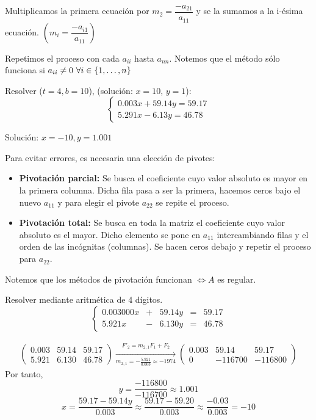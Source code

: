 Multiplicamos la primera ecuación por $m_2=\dfrac{-a_{21}}{a_{11}}$ y se la sumamos a la i-ésima ecuación. $\left(m_i = \dfrac{-a_{i1}}{a_{11}}\right)$

\smallskip
Repetimos el proceso con cada $a_{ii}$ hasta $a_{nn}$.
Notemos que el método sólo funciona si $a_{ii}\neq 0 \ \forall i \in \{1, \ldots, n\}$

\begin{ejercicio*}
    Resolver ($t=4, b=10$), (solución: $x=10$, $y=1$):
    $$
        \left\{
        \begin{array}{c}
            0.003x+59.14y=59.17 \\
            5.291x-6.13y=46.78
        \end{array}\right.
    $$

    Solución: $x=-10, y=1.001$
\end{ejercicio*}

\bigskip
\noindent
Para evitar errores, es necesaria una elección de pivotes:
\begin{itemize}
    \item \textbf{Pivotación parcial:} Se busca el coeficiente cuyo valor absoluto es mayor en la primera columna.
          Dicha fila pasa a ser la primera, hacemos ceros bajo el nuevo $a_{11}$ y para elegir el pivote $a_{22}$
          se repite el proceso.
    \item \textbf{Pivotación total:} Se busca en toda la matriz el coeficiente cuyo valor absoluto es el mayor.
          Dicho elemento se pone en $a_{11}$ intercambiando filas y el orden de las incógnitas (columnas).
          Se hacen ceros debajo y repetir el proceso para $a_{22}$.
\end{itemize}

Notemos que los métodos de pivotación funcionan $\Leftrightarrow A$ es regular.

\begin{ejercicio*} Resolver mediante aritmética de 4 dígitos.
\begin{equation*}
    \left\{\begin{array}{rcrcr}
        0.003000x & + & 59.14y & = & 59.17  \\
        5.921x & - &6.130y & = & 46.78
    \end{array}
    \right.
\end{equation*}

\begin{multline*}
    \left(\begin{array}{cc|c}
        0.003 & 59.14 & 59.17  \\
        5.921 & 6.130 & 46.78
    \end{array}
    \right) \xrightarrow[m_{2,1}=-\frac{5.921}{0.003}\approx -1974]{F'_2=m_{2,1}F_1 + F_2}
    \left(\begin{array}{cc|c}
        0.003 & 59.14 & 59.17  \\
        0 & -116700 & -116800
    \end{array}
    \right)
\end{multline*}
Por tanto,
$$y=\frac{-116800}{-116700}\approx 1.001$$
$$x=\frac{59.17 - 59.14y}{0.003} \approx \frac{59.17 - 59.20}{0.003}
\approx \frac{-0.03}{0.003}
= -10$$
\end{ejercicio*}


